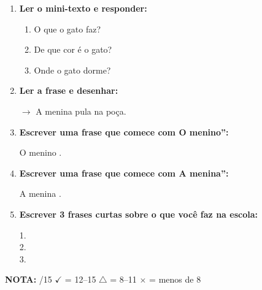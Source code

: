\begin{exercicio}
\begin{enumerate}[resume]
  \item \textbf{Ler o mini-texto e responder:}
  \begin{center}
  \end{center}
  \begin{enumerate}[label=\alph*)]
    \item O que o gato faz? \underline{\hspace{4cm}}
    \item De que cor é o gato? \underline{\hspace{4cm}}
    \item Onde o gato dorme? \underline{\hspace{4cm}}
  \end{enumerate}
  
  \item \textbf{Ler a frase e desenhar:}
  \begin{center}
  $\rightarrow$ A menina pula na poça.
  \end{center}
  \begin{center}
  \end{center}

  \item \textbf{Escrever uma frase que comece com O menino'':}
  \begin{center}
  O menino \underline{\hspace{8cm}}.
  \end{center}

  \item \textbf{Escrever uma frase que comece com A menina'':}
  \begin{center}
  A menina \underline{\hspace{8cm}}.
  \end{center}

  \item \textbf{Escrever 3 frases curtas sobre o que você faz na escola:}
  \begin{center}
  1. \underline{\hspace{10cm}} \\
  2. \underline{\hspace{10cm}} \\
  3. \underline{\hspace{10cm}}
  \end{center}
\end{enumerate}

\noindent\textbf{NOTA:} \underline{\hspace{1cm}}/15 \quad $\checkmark$ = 12--15 \quad $\triangle$ = 8--11 \quad $\times$ = menos de 8
\end{exercicio}

